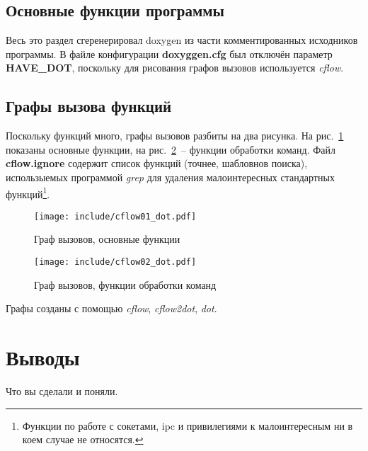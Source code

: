 \documentclass[a4paper,12pt]{report}
\begin{document}
\section{Основные функции программы}

Весь это раздел сгеренерировал doxygen из части комментированных исходников программы. В файле конфигурации \textbf{doxyggen.cfg} был отключён параметр \textbf{HAVE\_DOT}, поскольку для рисования графов вызовов используется \textit{cflow}.

%






%

\section{Графы вызова функций}

Поскольку функций много, графы вызовов разбиты на два рисунка. На рис.~\ref{fig:cflow01} показаны основные функции, на рис.~\ref{fig:cflow02}~-- функции обработки команд. Файл \textbf{cflow.ignore} содержит список функций (точнее, шабловнов поиска), использыемых программой \textit{grep} для удаления малоинтересных стандартных функций\footnote{Функции по работе с сокетами, ipc и привилегиями к малоинтересным ни в коем случае не относятся.}.

\begin{figure}
\centering
\texttt{[image: include/cflow01\_dot.pdf]}
\caption{Граф вызовов, основные функции}
\label{fig:cflow01}
\end{figure}

\begin{figure}
\centering
\texttt{[image: include/cflow02\_dot.pdf]}
\caption{Граф вызовов, функции обработки команд}
\label{fig:cflow02}
\end{figure}

Графы созданы с помощью \textit{cflow}, \textit{cflow2dot}, \textit{dot}.

\chapter*{Выводы}

Что вы сделали и поняли.
\end{document}
